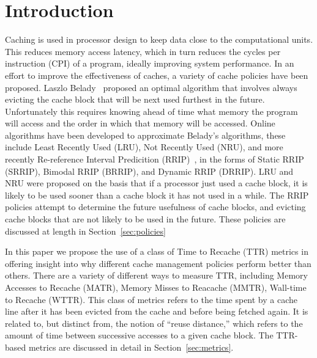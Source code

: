 \section{Introduction}
Caching is used in processor design to keep data close to the computational units.
This reduces memory access latency, which in turn reduces the cycles per instruction (CPI) of a program, ideally improving system performance.
In an effort to improve the effectiveness of caches, a variety of cache policies have been proposed.
Laszlo Belady~\cite{belady66} proposed an optimal algorithm that involves always evicting the cache block that will be next used furthest in the future.
Unfortunately this requires knowing ahead of time what memory the program will access and the order in which that memory will be accessed.
Online algorithms have been developed to approximate Belady's algorithms,
	these include Least Recently Used (LRU), Not Recently Used (NRU),
	and more recently Re-reference Interval Predicition (RRIP)~\cite{jaleeltheobald10},
	in the forms of Static RRIP (SRRIP), Bimodal RRIP (BRRIP), and Dynamic RRIP (DRRIP).
LRU and NRU were proposed on the basis that if a processor just used a cache block,
	it is likely to be used sooner than a cache block it has not used in a while.
The RRIP policies attempt to determine the future usefulness of cache blocks,
	and evicting cache blocks that are not likely to be used in the future.
These policies are discussed at length in Section~\ref{sec:policies}

In this paper we propose the use of a class of Time to Recache (TTR) metrics in offering insight into why different cache management policies perform better than others.  
There are a variety of different ways to measure TTR, including Memory Accesses to Recache (MATR), Memory Misses to Reacache (MMTR), Wall-time to Recache (WTTR). 
This class of metrics refers to the time spent by a cache line after it has been evicted from the cache and before being fetched again.  
It is related to, but distinct from, the notion of ``reuse distance,'' which refers to the amount of time between successive accesses to a given cache block.
The TTR-based metrics are discussed in detail in Section~\ref{sec:metrics}.

